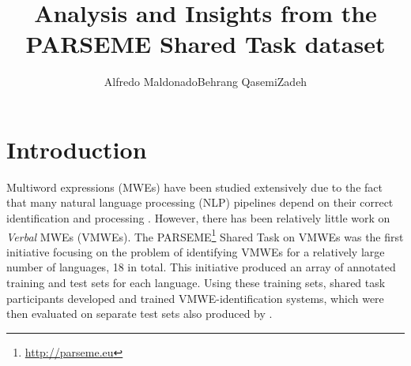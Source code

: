 \documentclass[output=paper,modfonts,nonflat,draftmode]{langsci/langscibook}
\title{Analysis and Insights from the PARSEME Shared Task dataset}
\author{Alfredo Maldonado\affiliation{ADAPT Centre, Trinity College Dublin}\lastand  Behrang QasemiZadeh\affiliation{University of Düsseldorf}}
\begin{document}
\maketitle
\label{MALDONADO-CHAPTER}
\section{Introduction} 






%

Multiword expressions (MWEs) have been studied extensively due to the fact that many natural language processing (NLP) pipelines depend on their correct identification and processing \citep{Sag2002a}. However, there has been relatively little work on \emph{Verbal} MWEs (VMWEs). The PARSEME\footnote{\url{http://parseme.eu}} Shared Task on VMWEs \citep{MWEWorkshop} was the first initiative focusing on the problem of identifying VMWEs for a relatively large number of languages, 18 in total. This initiative produced an array of annotated training and test sets for each language. Using these training sets, shared task participants developed and trained VMWE-identification systems, which were then evaluated on separate test sets also produced by . 
\end{document}
